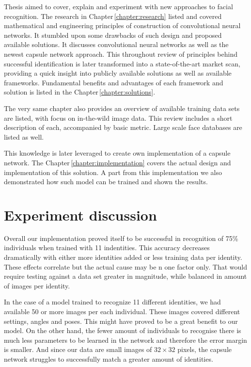 Thesis aimed to cover, explain and experiment with new approaches to facial recognition. The research in Chapter\,\ref{chapter:research} listed and covered mathematical and engineering principles of construction of convolutional neural networks. It stumbled upon some drawbacks of such design and proposed available solutions. It discusses convolutional neural networks as well as the newest capsule network approach. This throughout review of principles behind successful identification is later transformed into a state-of-the-art market scan, providing a quick insight into publicly available solutions as well as available frameworks. Fundamental benefits and advantages of each framework and solution is listed in the Chapter\,\ref{chapter:solutions}.

The very same chapter also provides an overview of available training data sets are listed, with focus on in-the-wild image data. This review includes a short description of each, accompanied by basic metric. Large scale face databases are listed as well.

This knowledge is later leveraged to create own implementation of a capsule network. The Chapter\,\ref{chapter:implementation} covers the actual design and implementation of this solution. A part from this implementation we also demonstrated how such model can be trained and shown the results.

\section{Experiment discussion}
Overall our implementation proved itself to be successful in recognition of 75\% individuals when trained with 11 indentities. This accuracy decreases dramatically with either more identities added or less training data per identity. These effects correlate but the actual cause may be n one factor only. That would require testing against a data set greater in magnitude, while balanced in amount of images per identity.

In the case of a model trained to recognize 11 different identities, we had available 50 or more images per each individual. These images covered different settings, angles and poses. This might have proved to be a great benefit to our model. On the other hand, the fewer amount of individuals to recognise there is much less parameters to be learned in the network and therefore the error margin is smaller. And since our data are small images of $32\times32$ pixels, the capsule network struggles to successfully match a greater amount of identities.


